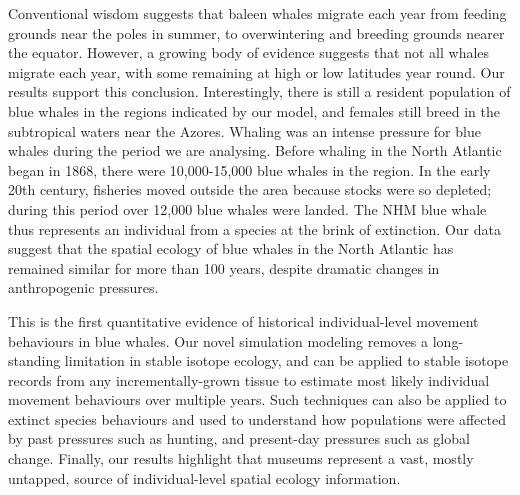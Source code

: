 \documentclass[a4paper,12pt]{article}
\begin{document}


 
Conventional wisdom suggests that baleen whales migrate each year from feeding grounds near the poles in summer, to overwintering and breeding grounds nearer the equator\cite{corkeron1999baleen,lockyer1981migration}. 
However, a growing body of evidence suggests that not all whales migrate each year, with some remaining at high or low latitudes year round\cite{mcdonald2006biogeographic,busquets2017estimating}. 
Our results support this conclusion. 
Interestingly, there is still a resident%
 population of blue whales in the regions indicated by our model, and females still breed in the subtropical waters near the Azores\cite{reilly2008balaenoptera}. 
Whaling was an intense pressure for blue whales during the period we are analysing. 
Before whaling in the North Atlantic began in 1868\cite{reilly2008balaenoptera}, there were 10,000-15,000 blue whales in the region\cite{sigurjonsson1995life}. 
In the early 20th century, fisheries moved outside the area because stocks were so depleted\cite{reilly2008balaenoptera}; during this period over 12,000 blue whales were landed\cite{sigurjonsson1995life}. 
The NHM blue whale thus represents an individual from a species at the brink of extinction.
Our data suggest that the spatial ecology of blue whales in the North Atlantic has remained similar for more than 100 years, despite dramatic changes in anthropogenic pressures. %

This is the first quantitative evidence of historical individual-level movement behaviours in blue whales. %
Our novel simulation modeling removes a long-standing limitation in stable isotope ecology, and can be applied to stable isotope records from any incrementally-grown tissue to estimate most likely individual movement behaviours over multiple years. 
Such techniques can also be applied to extinct species behaviours and used to understand how populations were affected by past pressures such as hunting, and present-day pressures such as global change. 
Finally, our results highlight that museums represent a vast, mostly untapped, source of individual-level spatial ecology information. %
\end{document}
